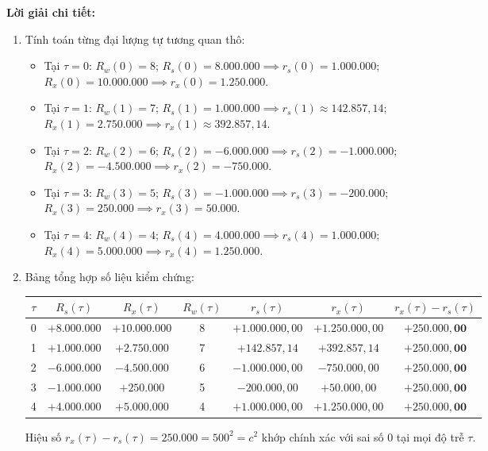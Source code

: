 \textbf{Lời giải chi tiết:}
\begin{enumerate}[label=(\alph*)]
    \item Tính toán từng đại lượng tự tương quan thô:
    \begin{itemize}[leftmargin=1.5em, itemsep=2pt]
        \item Tại $\tau = 0$: $R_w(0) = 8$; $R_s(0) = 8.000.000 \implies r_s(0) = 1.000.000$;\\
        $R_x(0) = 10.000.000 \implies r_x(0) = 1.250.000$.
        \item Tại $\tau = 1$: $R_w(1) = 7$; $R_s(1) = 1.000.000 \implies r_s(1) \approx 142.857{,}14$;\\
        $R_x(1) = 2.750.000 \implies r_x(1) \approx 392.857{,}14$.
        \item Tại $\tau = 2$: $R_w(2) = 6$; $R_s(2) = -6.000.000 \implies r_s(2) = -1.000.000$;\\
        $R_x(2) = -4.500.000 \implies r_x(2) = -750.000$.
        \item Tại $\tau = 3$: $R_w(3) = 5$; $R_s(3) = -1.000.000 \implies r_s(3) = -200.000$;\\
        $R_x(3) = 250.000 \implies r_x(3) = 50.000$.
        \item Tại $\tau = 4$: $R_w(4) = 4$; $R_s(4) = 4.000.000 \implies r_s(4) = 1.000.000$;\\
        $R_x(4) = 5.000.000 \implies r_x(4) = 1.250.000$.
    \end{itemize}

    \item Bảng tổng hợp số liệu kiểm chứng:
    \begin{center}
    \begin{tabular}{ccccccc}
    \toprule
    $\tau$ & $R_s(\tau)$ & $R_x(\tau)$ & $R_w(\tau)$ & $r_s(\tau)$ & $r_x(\tau)$ & $r_x(\tau) - r_s(\tau)$ \\
    \midrule
    0 & $+8.000.000$ & $+10.000.000$ & 8 & $+1.000.000{,}00$ & $+1.250.000{,}00$ & $\mathbf{+250.000{,}00}$ \\
    1 & $+1.000.000$ & $+2.750.000$  & 7 & $+142.857{,}14$   & $+392.857{,}14$   & $\mathbf{+250.000{,}00}$ \\
    2 & $-6.000.000$ & $-4.500.000$  & 6 & $-1.000.000{,}00$ & $-750.000{,}00$   & $\mathbf{+250.000{,}00}$ \\
    3 & $-1.000.000$ & $+250.000$    & 5 & $-200.000{,}00$   & $+50.000{,}00$    & $\mathbf{+250.000{,}00}$ \\
    4 & $+4.000.000$ & $+5.000.000$  & 4 & $+1.000.000{,}00$ & $+1.250.000{,}00$ & $\mathbf{+250.000{,}00}$ \\
    \bottomrule
    \end{tabular}
    \end{center}
    Hiệu số $r_x(\tau) - r_s(\tau) = 250.000 = 500^2 = c^2$ khớp chính xác với sai số $0$ tại mọi độ trễ $\tau$.


\end{enumerate}
